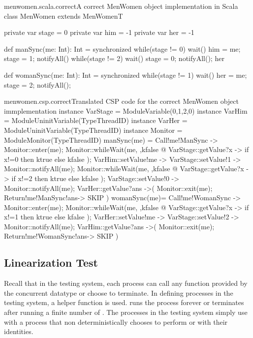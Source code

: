 \documentclass[a4paper, 12pt]{article}
\begin{document}
\begin{scalafloat}{menwomen.scala.correct}{A correct MenWomen object implementation in Scala}
class MenWomen extends MenWomenT{
  private var stage = 0
  private var him = -1
  private var her = -1

  def manSync(me: Int): Int = synchronized{
    while(stage != 0) wait()         
    him = me; stage = 1; notifyAll() 
    while(stage != 2) wait()
    stage = 0; notifyAll(); her
  }

  def womanSync(me: Int): Int = synchronized{
    while(stage != 1) wait()
    her = me; stage = 2; notifyAll();
  }
}
\end{scalafloat}

\begin{cspfloat}{menwomen.csp.correct}{Translated CSP code for the correct MenWomen object immplementation}
instance VarStage = ModuleVariable({0,1,2},0) 
instance VarHim = ModuleUninitVariable(TypeThreadID)
instance VarHer = ModuleUninitVariable(TypeThreadID)
instance Monitor = ModuleMonitor(TypeThreadID)
manSync(me) = 
  Call!me!ManSync ->
  Monitor::enter(me);
    Monitor::whileWait(me, \ktrue,kfalse @
      VarStage::getValue?x ->
      if x!=0 then ktrue else kfalse
    );
    VarHim::setValue!me ->
    VarStage::setValue!1 ->
    Monitor::notifyAll(me);
    Monitor::whileWait(me, \ktrue,kfalse @
      VarStage::getValue?x ->
      if x!=2 then ktrue else kfalse
    );
    VarStage::setValue!0 ->
    Monitor::notifyAll(me);
    VarHer::getValue?ans ->(
  Monitor::exit(me);
  Return!me!ManSync!ans->
  SKIP
  )
womanSync(me)=
  Call!me!WomanSync ->
  Monitor::enter(me);
    Monitor::whileWait(me, \ktrue,kfalse @
      VarStage::getValue?x ->
      if x!=1 then ktrue else kfalse
    );
    VarHer::setValue!me ->
    VarStage::setValue!2 ->
    Monitor::notifyAll(me);
    VarHim::getValue?ans ->(
  Monitor::exit(me);
  Return!me!WomanSync!ans->
  SKIP
  )
\end{cspfloat}


\subsection{Linearization Test}
Recall that in the testing system, each process can call any function provided by the concurrent datatype or choose to terminate. In defining processes in the testing system, a helper function is used.  runs the process  forever or terminates after running a finite number of . The processes in the testing system simply use  with a process that non deterministically chooses to perform  or  with their identities. 
\end{document}
